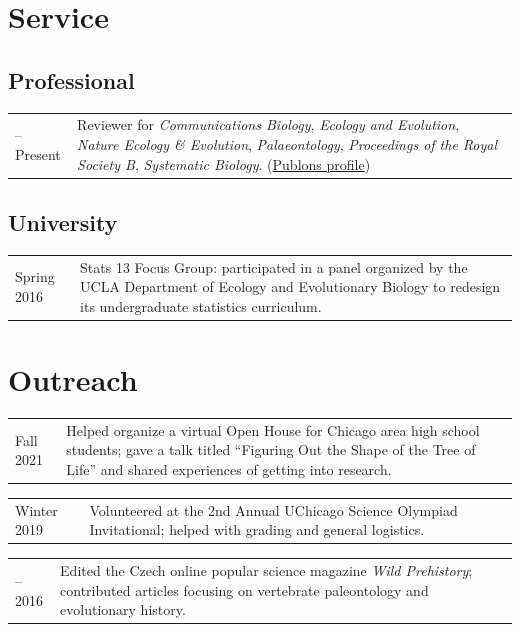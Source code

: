 \documentclass[10pt]{article}
\begin{document}
\section*{Service}

\subsection*{Professional}

\begin{tabularx}{\textwidth}{>{\raggedleft\arraybackslash}p{2.2cm} X}
2019--Present & Reviewer for \textit{Communications Biology}, \textit{Ecology and Evolution}, \textit{Nature Ecology \& Evolution}, \textit{Palaeontology}, \textit{Proceedings of the Royal Society B}, \textit{Systematic Biology}. (\href{https://publons.com/a/3033367}{Publons profile})
\end{tabularx}

\subsection*{University}

\begin{tabularx}{\textwidth}{>{\raggedleft\arraybackslash}p{2.2cm} X}
Spring 2016 & Stats 13 Focus Group: participated in a panel organized by the UCLA Department of Ecology and Evolutionary Biology to redesign its undergraduate statistics curriculum.
\end{tabularx}

\section*{Outreach}

\begin{tabularx}{\textwidth}{>{\raggedleft\arraybackslash}p{2.2cm} X}
Fall 2021 & Helped organize a virtual Open House for Chicago area high school students; gave a talk titled ``Figuring Out the Shape of the Tree of Life'' and shared experiences of getting into research.
\end{tabularx}
\begin{tabularx}{\textwidth}{>{\raggedleft\arraybackslash}p{2.2cm} X}
Winter 2019 & Volunteered at the 2nd Annual UChicago Science Olympiad Invitational; helped with grading and general logistics.
\end{tabularx}
\begin{tabularx}{\textwidth}{>{\raggedleft\arraybackslash}p{2.2cm} X}
2015--2016 & Edited the Czech online popular science magazine \textit{Wild Prehistory}; contributed articles focusing on vertebrate paleontology and evolutionary history.
\end{tabularx}
\end{document}
